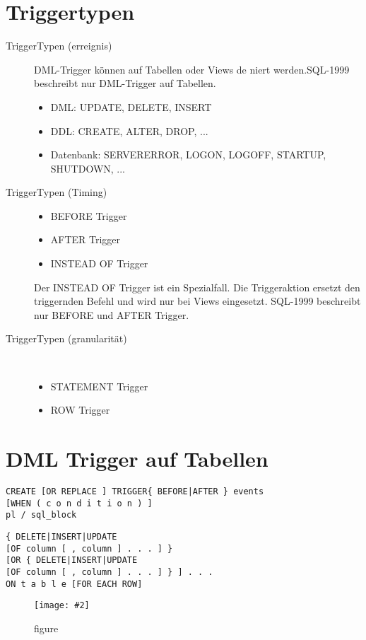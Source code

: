 \documentclass[a4paper,10pt,titlepage=false]{scrreprt}
\newcommand{\pic}[2][figure]{\begin{figure}[h]
 \centering
 \texttt{[image: \#2]}
 \caption{#1}
\end{figure}
}
\begin{document}
\section{Triggertypen} %
\label{sec:triggertypen}
\begin{description}
  \item[TriggerTypen (erreignis)] DML-Trigger können auf Tabellen oder Views de niert
werden.SQL-1999 beschreibt nur DML-Trigger auf Tabellen.\\

\begin{itemize}
  \item DML: UPDATE, DELETE, INSERT
\item DDL: CREATE, ALTER, DROP, ...
\item Datenbank: SERVERERROR, LOGON, LOGOFF, STARTUP,
SHUTDOWN, ...

\end{itemize}
 \item[TriggerTypen (Timing)] 
\begin{itemize}
  \item BEFORE Trigger
\item AFTER Trigger
\item INSTEAD OF Trigger
\end{itemize}
 Der INSTEAD OF Trigger ist ein Spezialfall. Die
Triggeraktion ersetzt den triggernden Befehl und wird nur
bei Views eingesetzt.
SQL-1999 beschreibt nur BEFORE und AFTER Trigger.
\item[TriggerTypen (granularität)] \hfill \\
\begin{itemize}
  \item STATEMENT Trigger
\item ROW Trigger
\end{itemize}

\end{description}
\section{DML Trigger auf Tabellen} %
\label{sec:dml_trigger_auf_tabellen}
\begin{lstlisting}[caption=Syntax von DML Trigger,style=sql]
  CREATE [OR REPLACE ] TRIGGER{ BEFORE|AFTER } events
[WHEN ( c o n d i t i o n ) ]
pl / sql_block
\end{lstlisting}
\begin{lstlisting}[caption=Events von DML Trigger,style=sql]
  { DELETE|INSERT|UPDATE
[OF column [ , column ] . . . ] }
[OR { DELETE|INSERT|UPDATE
[OF column [ , column ] . . . ] } ] . . .
ON t a b l e [FOR EACH ROW]

\end{lstlisting}
\pic{plsql.png}
\end{document}

